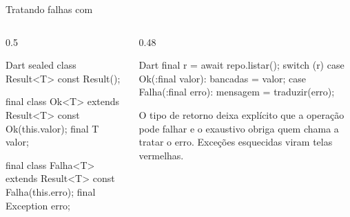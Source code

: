 \documentclass[aspectratio=169,10pt]{beamer}
\begin{document}
\begin{frame}[fragile]{Tratando falhas com }
  \begin{columns}[T]
    \begin{column}{0.5\textwidth}
\begin{codigo}[title=utils/result.dart]{Dart}
sealed class Result<T> {
  const Result();
}

final class Ok<T> extends Result<T> {
  const Ok(this.valor);
  final T valor;
}

final class Falha<T> extends Result<T> {
  const Falha(this.erro);
  final Exception erro;
}
\end{codigo}
    \end{column}
    \begin{column}{0.48\textwidth}
\begin{codigo}[title=Usando]{Dart}
final r = await repo.listar();
switch (r) {
  case Ok(:final valor):
    bancadas = valor;
  case Falha(:final erro):
    mensagem = traduzir(erro);
}
\end{codigo}
      \begin{conceito}
        O tipo de retorno deixa explícito que a operação pode falhar e o  exaustivo obriga quem chama a tratar o erro. Exceções esquecidas viram telas vermelhas.
      \end{conceito}
    \end{column}
  \end{columns}
\end{frame}
\end{document}
